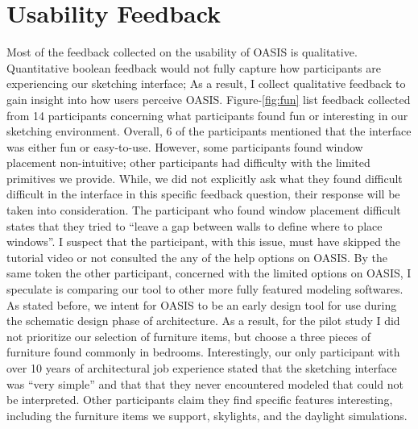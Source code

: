 \section{Usability Feedback}

Most of the feedback collected on the usability of OASIS is qualitative.
Quantitative boolean feedback would not fully capture how participants are experiencing our sketching interface;
As a result, I collect qualitative feedback to gain insight into how users perceive OASIS.
Figure-\ref{fig:fun} list feedback collected from 14 participants concerning what participants found fun or interesting in our sketching environment.
Overall, 6 of the participants mentioned that the interface was either fun or easy-to-use.
However, some participants found window placement non-intuitive; 
other participants had difficulty with the limited primitives we provide.
While, we did not explicitly ask what they found difficult difficult in the interface in this specific feedback question, their response will be taken into consideration.
The participant who found window placement difficult states that they tried to ``leave a gap between walls to define where to place windows''.
I suspect that the participant, with this issue, must have skipped the tutorial video or not consulted the any of the help options on OASIS.
By the same token the other participant, concerned with the limited options on OASIS, I speculate is comparing our tool to other more fully featured modeling softwares.
As stated before, we intent for OASIS to be an early design tool for use during the schematic design phase of architecture.
As a result, for the pilot study I did not prioritize our selection of furniture items, but choose a three pieces of furniture found commonly in bedrooms.
Interestingly, our only participant with over 10 years of architectural job experience stated that the sketching interface was ``very simple'' and that that they never encountered modeled that could not be interpreted.
Other participants claim they find specific features interesting, including the furniture items we support, skylights, and the daylight simulations.\\

